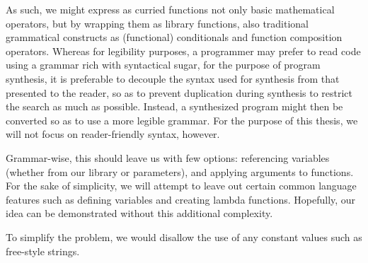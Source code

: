 \documentclass{article}
\begin{document}
As such, we might express as curried functions not only basic mathematical operators,
but by wrapping them as library functions,
also traditional grammatical constructs as (functional) conditionals and function composition operators.
Whereas for legibility purposes, a programmer may prefer to read code using a grammar rich with syntactical sugar,
for the purpose of program synthesis,
it is preferable to decouple the syntax used for synthesis from that presented to the reader,
so as to prevent duplication during synthesis to restrict the search as much as possible.
Instead, a synthesized program might then be converted so as to use a more legible grammar.
For the purpose of this thesis, we will not focus on reader-friendly syntax, however.

Grammar-wise, this should leave us with few options:
referencing variables (whether from our library or parameters),
and applying arguments to functions.
For the sake of simplicity,
we will attempt to leave out certain common language features such as defining variables and creating lambda functions.
Hopefully, our idea can be demonstrated without this additional complexity.

To simplify the problem, we would disallow the use of any constant values such as free-style strings.
\end{document}
